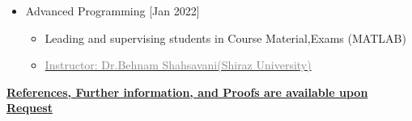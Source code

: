 \documentclass[10pt,a4paper,sans]{moderncv} %
\begin{document}
\begin{itemize}
\begin{itemize}
\begin{itemize}
			\end{itemize}
	 		
				\newline
			
	\end{itemize}
	
	\vspace{0.5em}
	
	\begin{itemize}
     
			\item {} Advanced Programming  \hfill[Jan 2022]
			\begin{itemize} 
				\item Leading and supervising students in Course Material,Exams (MATLAB)
				\item\href{https://scholar.google.com/citations?user=-ppHUiQAAAAJ&hl=en}{\textcolor{gray}{Instructor: Dr.Behnam Shahsavani(Shiraz University)}}
				
	 		
				\newline
			
		\end{itemize}
	\end{itemize}
	\end{itemize}
	
	\vspace{0.5em}
	

	
	\vspace{1.3 em}
	
	
	
	\centerline{\underline{\textbf{	\faExclamationCircle \hspace{0.5 pt} References, Further information, and Proofs are available upon Request }}}
	
\end{document}

